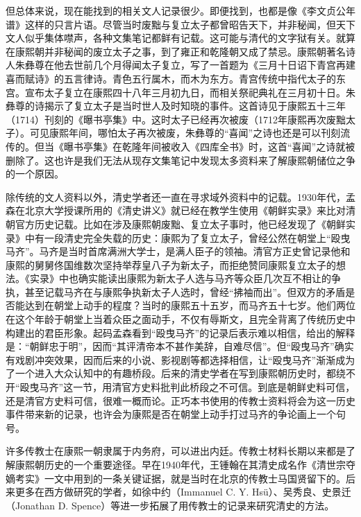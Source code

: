 
但总体来说，现在能找到的相关文人记录很少。即便找到，也都是像《李文贞公年谱》这样的只言片语。尽管当时废黜与复立太子都曾昭告天下，并非秘闻，但天下文人似乎集体噤声，各种文集笔记都鲜有记载。这可能与清代的文字狱有关。就算在康熙朝并非秘闻的废立太子之事，到了雍正和乾隆朝又成了禁忌。康熙朝著名诗人朱彝尊在他去世前几个月得闻太子复立，写了一首题为《三月十日诏下青宫再建喜而赋诗》的五言律诗。青色五行属木，而木为东方。青宫传统中指代太子的东宫。宣布太子复立在康熙四十八年三月初九日，而相关祭祀典礼在三月初十日。朱彝尊的诗揭示了复立太子是当时世人及时知晓的事件。这首诗见于康熙五十三年（1714）刊刻的《曝书亭集》中。这时太子已经再次被废（1712年康熙再次废黜太子）。可见康熙年间，哪怕太子再次被废，朱彝尊的“喜闻”之诗也还是可以刊刻流传的。但当《曝书亭集》在乾隆年间被收入《四库全书》时，这首“喜闻”之诗就被删除了。这也许是我们无法从现存文集笔记中发现太多资料来了解康熙朝储位之争的一个原因。



除传统的文人资料以外，清史学者还一直在寻求域外资料中的记载。1930年代，孟森在北京大学授课所用的《清史讲义》就已经在教学生使用《朝鲜实录》来比对清朝官方历史记载。比如在涉及康熙朝废黜、复立太子事时，他已经发现了《朝鲜实录》中有一段清史完全失载的历史：康熙为了复立太子，曾经公然在朝堂上“殴曳马齐”。马齐是当时首席满洲大学士，是满人臣子的领袖。清官方正史曾记录他和康熙的舅舅佟国维数次坚持举荐皇八子为新太子，而拒绝赞同康熙复立太子的想法。《实录》中也确实能读出康熙为新太子人选与马齐等众臣几次互不相让的争执，甚至记载马齐在与康熙争执新太子人选时，曾经“拂袖而出”。但双方的矛盾是否能达到在朝堂上动手的程度？当时的康熙五十五岁，而马齐五十七岁。他们两位在这个年龄于朝堂上当着众臣之面动手，不仅有辱斯文，且完全背离了传统历史中构建出的君臣形象。起码孟森看到“殴曳马齐”的记录后表示难以相信，给出的解释是：“朝鲜忠于明”，因而“其评清帝本不甚作美辞，自难尽信”。但“殴曳马齐”确实有戏剧冲突效果，因而后来的小说、影视剧等都选择相信，让“殴曳马齐”渐渐成为了一个进入大众认知中的有趣桥段。后来的清史学者在写到康熙朝历史时，都绕不开“殴曳马齐”这一节，用清官方史料批判此桥段之不可信。到底是朝鲜史料可信，还是清官方史料可信，很难一概而论。正巧本书使用的传教士资料将会为这一历史事件带来新的记录，也许会为康熙是否在朝堂上动手打过马齐的争论画上一个句号。



许多传教士在康熙一朝隶属于内务府，可以进出内廷。传教士材料长期以来都是了解康熙朝历史的一个重要途径。早在1940年代，王锺翰在其清史成名作《清世宗夺嫡考实》一文中用到的一条关键证据，就是当时在北京的传教士马国贤留下的。后来更多在西方做研究的学者，如徐中约（Immanuel C. Y. Hsü）、吴秀良、史景迁（Jonathan D. Spence）等进一步拓展了用传教士的记录来研究清史的方法。


